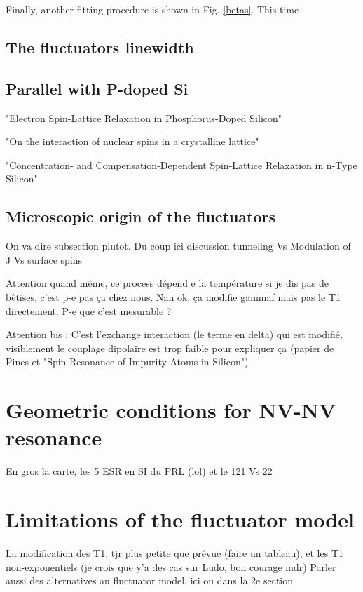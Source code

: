 \documentclass[a4paper,11pt]{report}
\begin{document}
Finally, another fitting procedure is shown in Fig. \ref{betas}. This time  

\subsection{The fluctuators linewidth}
\subsection{Parallel with P-doped Si}
"Electron Spin-Lattice Relaxation in Phosphorus-Doped Silicon"

"On the interaction of nuclear spins in a crystalline lattice"

"Concentration- and Compensation-Dependent Spin-Lattice Relaxation in n-Type Silicon"
\subsection{Microscopic origin of the fluctuators}
On va dire subsection plutot.
Du coup ici discussion tunneling Vs Modulation of J Vs surface spins

Attention quand même, ce process dépend e la température si je dis pas de bêtises, c'est p-e pas ça chez nous. Nan ok, ça modifie gammaf mais pas le T1 directement. P-e que c'est mesurable ?

Attention bis : C'est l'exchange interaction (le terme en delta) qui est modifié, visiblement le couplage dipolaire est trop faible pour expliquer ça (papier de Pines et "Spin Resonance of Impurity Atoms in Silicon")

\section{Geometric conditions for NV-NV resonance}
En gros la carte, les 5 ESR en SI du PRL (lol) et le 121 Vs 22

\section{Limitations of the fluctuator model}
La modification des T1, tjr plus petite que prévue (faire un tableau), et les T1 non-exponentiels (je crois que y'a des cas sur Ludo, bon courage mdr)
Parler aussi des alternatives au fluctuator model, ici ou dans la 2e section

\printbibliography
\end{document}
